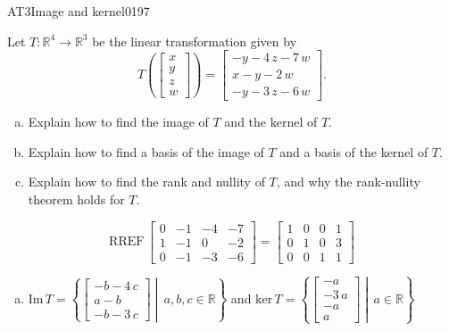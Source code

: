 \begin{exercise}{AT3}{Image and kernel}{0197} 
\begin{exerciseStatement} 

 Let \(T:\mathbb{R}^4 \to \mathbb{R}^3\) be the linear transformation given by \[T\left( \left[\begin{array}{c}
x \\
y \\
z \\
{w}
\end{array}\right] \right) = \left[\begin{array}{c}
-y - 4 \, z - 7 \, {w} \\
x - y - 2 \, {w} \\
-y - 3 \, z - 6 \, {w}
\end{array}\right].\] 

 

\begin{enumerate}[(a)]
\item Explain how to find the image of \(T\) and the kernel of \(T\).
\item Explain how to find a basis of the image of \(T\) and a basis of the kernel of \(T\).
\item Explain how to find the rank and nullity of \(T\), and why the rank-nullity theorem holds for \(T\).
\end{enumerate}

     \end{exerciseStatement}
 \begin{exerciseAnswer} 

\[\mathrm{RREF}\,\left[\begin{array}{cccc}
0 & -1 & -4 & -7 \\
1 & -1 & 0 & -2 \\
0 & -1 & -3 & -6
\end{array}\right]=\left[\begin{array}{cccc}
1 & 0 & 0 & 1 \\
0 & 1 & 0 & 3 \\
0 & 0 & 1 & 1
\end{array}\right]\]

 

\begin{enumerate}[(a)]
\item  

 \(\mathrm{Im}\,T =  \left\{ \left[\begin{array}{c}
-b - 4 \, c \\
a - b \\
-b - 3 \, c
\end{array}\right] \middle|\,a,b,c\in\mathbb{R}\right\}\) and \(\mathrm{ker}\,T = \left\{ \left[\begin{array}{c}
-a \\
-3 \, a \\
-a \\
a
\end{array}\right] \middle|\,a\in\mathbb{R}\right\}\) 


\end{enumerate}
\end{exerciseAnswer}
\end{exercise}
